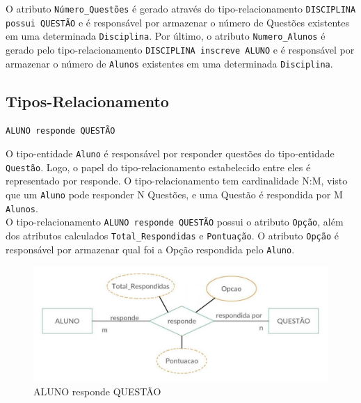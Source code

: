 \documentclass[12pt,a4paper]{article}
\begin{document}
O atributo \texttt{Número\_Questões} é gerado através do tipo-relacionamento \texttt{DISCIPLINA possui QUESTÃO} e é responsável por armazenar o número de Questões existentes em uma determinada \texttt{Disciplina}. Por último, o atributo \texttt{Numero\_Alunos} é gerado pelo tipo-relacionamento \texttt{DISCIPLINA inscreve ALUNO} e é responsável por armazenar o número de \texttt{Alunos} existentes em uma determinada \texttt{Disciplina}.\\

\subsection{Tipos-Relacionamento}

\vspace{0.5cm}
\begin{center}
    \texttt{{ALUNO \texttt{responde} QUESTÃO}}
\end{center}

O tipo-entidade {\texttt{Aluno}} é responsável por responder questões do tipo-entidade \texttt{Questão}. Logo, o papel do tipo-relacionamento estabelecido entre eles é representado por responde. O tipo-relacionamento tem cardinalidade N:M, visto que um \texttt{Aluno} pode responder N Questões, e uma Questão é respondida por M \texttt{Alunos}.\\

O tipo-relacionamento \texttt{{ALUNO responde QUESTÃO}} possui o atributo \texttt{Opção}, além dos atributos calculados \texttt{Total\_Respondidas} e \texttt{Pontuação}. O atributo \texttt{Opção} é responsável por armazenar qual foi a Opção respondida pelo \texttt{Aluno}.

\pagebreak
\begin{center}
\centering
\begin{figure}[h]
    \centering
    \includegraphics[width=\linewidth]{alunoQuestao.jpg}
    \caption{ALUNO responde QUESTÃO}
    \label{fig:alunoQuestao}
\end{figure}
\end{center}
\end{document}
